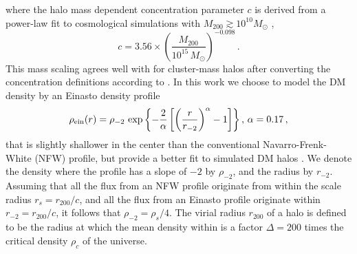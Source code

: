\documentclass[10pt,aps,pra,reprint,amsmath,amsfonts,amssymb,showpacs]{revtex4-1}
\newcommand{\msun}{M_\odot}
\newcommand{\rhos}{\ensuremath{\rho_s}}
\newcommand{\rs}{\ensuremath{r_s}}
\newcommand{\rvir}{r_{200}}
\newcommand{\mvir}{M_{200}}
\newcommand{\rhoc}{\ensuremath{\rho_c}}
\begin{document}
 where the halo mass dependent concentration parameter $c$ is derived
 from a power-law fit to cosmological simulations with $\mvir \gtrsim
 10^{10} \msun$ \cite{2008MNRAS.391.1940M},
\begin{equation}
\label{eq:cfit}
  c=3.56 \times \left(\frac{\mvir}{10^{15}\,\msun}\right)^{-0.098}\,.
\end{equation}
This mass scaling agrees well with \cite{2009ApJ...707..354Z} for
cluster-mass halos after converting the concentration definitions
according to \cite{2003ApJ...584..702H}. In this work we choose to
model the DM density by an Einasto density profile
\begin{equation}
\rho_{\rm ein}(r) = \rho_{-2}\,\exp\left\{-\frac{2}{\alpha}
  \left[\left(\frac{r}{r_{-2}}\right)^\alpha -1 \right] \right\},\,
\alpha=0.17 \,,
\end{equation}
that is slightly shallower in the center than the conventional
Navarro-Frenk-White (NFW) profile, but provide a better fit to
simulated DM halos \cite{2010MNRAS.402...21N}. We denote the density
where the profile has a slope of $-2$ by $\rho_{-2}$, and the radius
by $r_{-2}$. Assuming that all the flux from an NFW profile originate
from within the scale radius $\rs=\rvir/c$, and all the flux from an
Einasto profile originate within $r_{-2}=\rvir/c$, it follows that
$\rho_{-2} = \rhos/4$. The virial radius $\rvir$ of a halo is defined
to be the radius at which the mean density within is a factor
$\Delta=200$ times the critical density $\rhoc$ of the universe.
\end{document}
